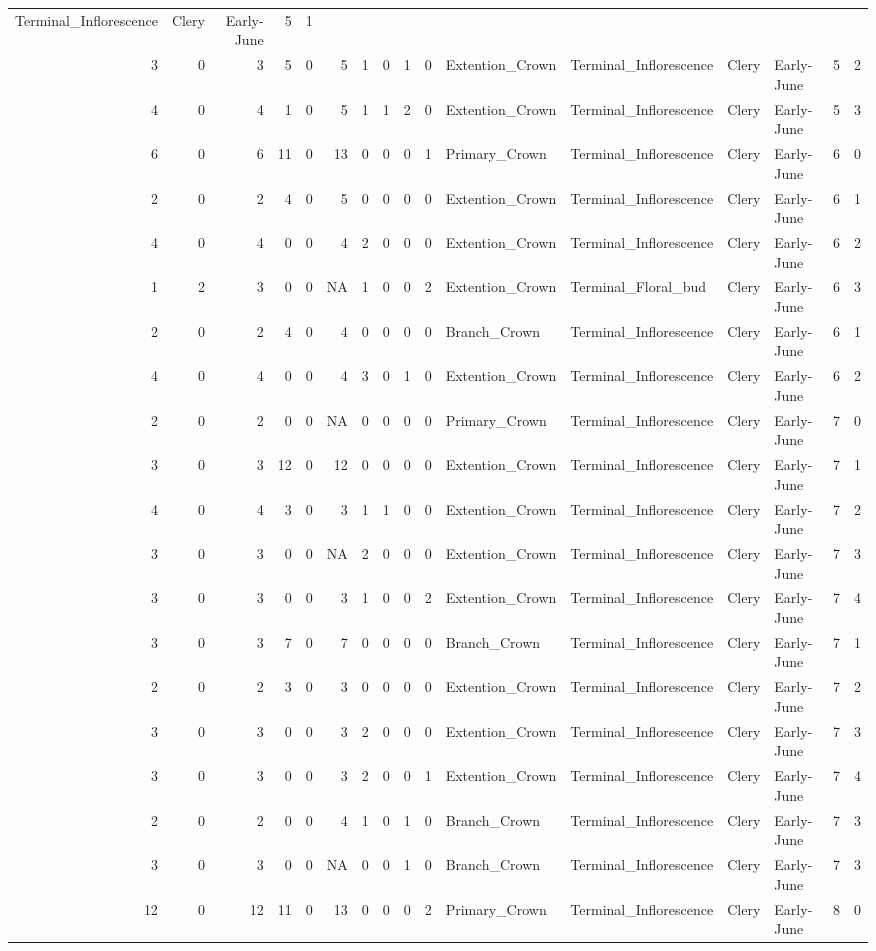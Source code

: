 \documentclass[]{article}
\begin{document}
\begin{longtable}[]{@{}rrrrrrrrrrllllrl@{}}
Terminal\_Inflorescence & Clery & Early-June & 5 & 1\tabularnewline
3 & 0 & 3 & 5 & 0 & 5 & 1 & 0 & 1 & 0 & Extention\_Crown &
Terminal\_Inflorescence & Clery & Early-June & 5 & 2\tabularnewline
4 & 0 & 4 & 1 & 0 & 5 & 1 & 1 & 2 & 0 & Extention\_Crown &
Terminal\_Inflorescence & Clery & Early-June & 5 & 3\tabularnewline
6 & 0 & 6 & 11 & 0 & 13 & 0 & 0 & 0 & 1 & Primary\_Crown &
Terminal\_Inflorescence & Clery & Early-June & 6 & 0\tabularnewline
2 & 0 & 2 & 4 & 0 & 5 & 0 & 0 & 0 & 0 & Extention\_Crown &
Terminal\_Inflorescence & Clery & Early-June & 6 & 1\tabularnewline
4 & 0 & 4 & 0 & 0 & 4 & 2 & 0 & 0 & 0 & Extention\_Crown &
Terminal\_Inflorescence & Clery & Early-June & 6 & 2\tabularnewline
1 & 2 & 3 & 0 & 0 & NA & 1 & 0 & 0 & 2 & Extention\_Crown &
Terminal\_Floral\_bud & Clery & Early-June & 6 & 3\tabularnewline
2 & 0 & 2 & 4 & 0 & 4 & 0 & 0 & 0 & 0 & Branch\_Crown &
Terminal\_Inflorescence & Clery & Early-June & 6 & 1\tabularnewline
4 & 0 & 4 & 0 & 0 & 4 & 3 & 0 & 1 & 0 & Extention\_Crown &
Terminal\_Inflorescence & Clery & Early-June & 6 & 2\tabularnewline
2 & 0 & 2 & 0 & 0 & NA & 0 & 0 & 0 & 0 & Primary\_Crown &
Terminal\_Inflorescence & Clery & Early-June & 7 & 0\tabularnewline
3 & 0 & 3 & 12 & 0 & 12 & 0 & 0 & 0 & 0 & Extention\_Crown &
Terminal\_Inflorescence & Clery & Early-June & 7 & 1\tabularnewline
4 & 0 & 4 & 3 & 0 & 3 & 1 & 1 & 0 & 0 & Extention\_Crown &
Terminal\_Inflorescence & Clery & Early-June & 7 & 2\tabularnewline
3 & 0 & 3 & 0 & 0 & NA & 2 & 0 & 0 & 0 & Extention\_Crown &
Terminal\_Inflorescence & Clery & Early-June & 7 & 3\tabularnewline
3 & 0 & 3 & 0 & 0 & 3 & 1 & 0 & 0 & 2 & Extention\_Crown &
Terminal\_Inflorescence & Clery & Early-June & 7 & 4\tabularnewline
3 & 0 & 3 & 7 & 0 & 7 & 0 & 0 & 0 & 0 & Branch\_Crown &
Terminal\_Inflorescence & Clery & Early-June & 7 & 1\tabularnewline
2 & 0 & 2 & 3 & 0 & 3 & 0 & 0 & 0 & 0 & Extention\_Crown &
Terminal\_Inflorescence & Clery & Early-June & 7 & 2\tabularnewline
3 & 0 & 3 & 0 & 0 & 3 & 2 & 0 & 0 & 0 & Extention\_Crown &
Terminal\_Inflorescence & Clery & Early-June & 7 & 3\tabularnewline
3 & 0 & 3 & 0 & 0 & 3 & 2 & 0 & 0 & 1 & Extention\_Crown &
Terminal\_Inflorescence & Clery & Early-June & 7 & 4\tabularnewline
2 & 0 & 2 & 0 & 0 & 4 & 1 & 0 & 1 & 0 & Branch\_Crown &
Terminal\_Inflorescence & Clery & Early-June & 7 & 3\tabularnewline
3 & 0 & 3 & 0 & 0 & NA & 0 & 0 & 1 & 0 & Branch\_Crown &
Terminal\_Inflorescence & Clery & Early-June & 7 & 3\tabularnewline
12 & 0 & 12 & 11 & 0 & 13 & 0 & 0 & 0 & 2 & Primary\_Crown &
Terminal\_Inflorescence & Clery & Early-June & 8 & 0\tabularnewline

\end{longtable}
\end{document}
